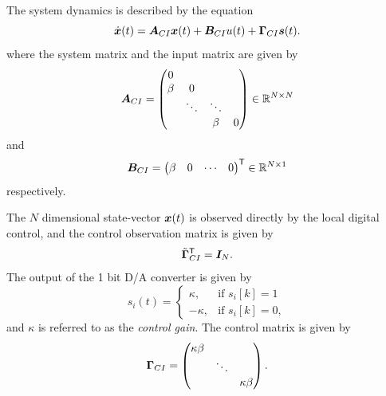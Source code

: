 The system dynamics is described by the equation
\begin{equation}
    \label{eq:CI_state_space_eq}
    \dot{\bm{x}}(t) = \bm{A}_{CI}\bm{x}(t) + \bm{B}_{CI}u(t) + \bm{\Gamma}_{CI}\bm{s}(t).
\end{equation}
where the system matrix and the input matrix are given by
\begin{equation}
    \label{eq:ci_amat}
    \bm{A}_{CI} =
    \begin{pmatrix}
    0  \\
    \beta & 0 \\
    & \ddots & \ddots & \\
    & &  \beta & 0
    \end{pmatrix}
    \in \mathbb{R}^{N \times N}
\end{equation}
and
\begin{equation}
    \label{eq:ci_bmat}
    \bm{B}_{CI} = 
    \begin{pmatrix}
        \beta & 0 & \cdots & 0
    \end{pmatrix}
    ^\mathsf{T}
    \in \mathbb{R}^{N \times 1}
\end{equation}
respectively.

The $N$ dimensional state-vector $\bm{x}(t)$ is observed directly by the local digital control, and the control observation matrix is given by
\begin{equation}
    \label{eq:ci_GmattildeT}
    \tilde{\bm{\Gamma}}^\mathsf{T}_{CI} = \bm{I}_{N}.
\end{equation}
The output of the 1 bit D/A converter is given by
\begin{equation}
    s_i(t) =
    \begin{cases}
        \kappa, & \text{if } s_i[k]=1 \\
        -\kappa,& \text{if } s_i[k]=0,
    \end{cases}
\end{equation}
and $\kappa$ is referred to as the \textit{control gain}. The control matrix is given by
\begin{equation}
    \label{eq:ci_Gmat}
    \bm{\Gamma}_{CI} =
    \begin{pmatrix}
        \kappa \beta \\
        & \ddots \\
        & & \kappa \beta
    \end{pmatrix}.
\end{equation}

